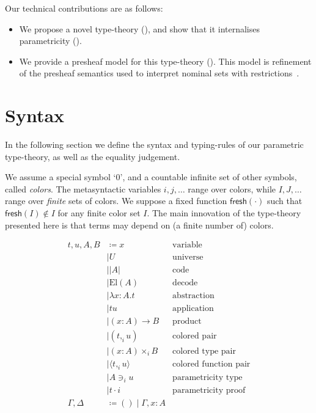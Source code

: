 \documentclass[english]{PaperTools/latex/lipics}
\newcommand\CP[3]{(#2,_{#1} #3)}
\newcommand\CTimes[2]{(#2) ×_{#1}}
\newcommand\param[1]{\!\cdot\!#1}
\newcommand\op[1]{∋_{#1}}
\newcommand\fp[3]{⟨#2 ,_{#1} #3⟩}
\newcommand\comment[1]{}
\def\fresh#1{\mathsf{fresh}(#1)}
\def\El#1{\mathrm{El}(#1)}
\begin{document}
Our technical contributions are as follows:
\begin{itemize}
\item We propose a novel type-theory (), and show
  that it internalises parametricity ().
\item We provide a presheaf model for this type-theory ().
      This model is refinement of the presheaf semantics used to
      interpret nominal sets with
      restrictions~\citep{bezem2014model,DBLP:journals/corr/Pitts14}.
\end{itemize}

\section{Syntax}
\label{sec:syntax}
In the following section we define the syntax and typing-rules of our
parametric type-theory, as well as the equality judgement.

We assume a special symbol ‘0’, and a countable infinite set of other
symbols, called \emph{colors}.
The metasyntactic variables $i,j,\ldots$ range over colors, while
$I,J,…$ range over \emph{finite} sets of colors.
We suppose a fixed function $\fresh{·}$ such that
$\fresh{I} ∉ I$ for any finite color set $I$.
%
The main innovation of the type-theory
presented here is that terms may depend on (a finite number of)
colors.
\begin{definition}
  \begin{align*}
    t,u,A,B & \coloneqq x & \text {variable} \\
            & \mid U & \text{universe} \\ 
            & \mid |A| & \text{code} \\ 
            & \mid \El{A} & \text{decode} \\
            & \mid λx:A. t & \text{abstraction} \\
            & \mid t u & \text{application} \\ 
            & \mid (x:A) → B & \text{product} \\
            & \mid \CP i t u & \text{colored pair} \\
            & \mid \CTimes i {x:A} B  & \text{colored type pair} \\
            & \mid \fp i t u & \text{colored function pair}\\
            & \mid A \op i u & \text{parametricity type} \\
            & \mid t \param i & \text{parametricity proof} \\
    \Gamma,\Delta & \coloneqq () \mid \Gamma,x:A
  \end{align*}
\end{definition}
\end{document}
